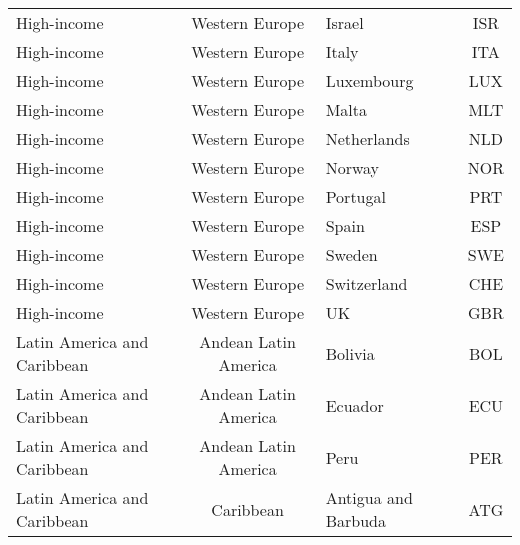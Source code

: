 \begin{landscape}
\begin{longtable}{|p{6cm}|c|p{5cm}|c|}
                                      High-income &               Western Europe &                                            Israel &  ISR \\
                                      High-income &               Western Europe &                                             Italy &  ITA \\
                                      High-income &               Western Europe &                                        Luxembourg &  LUX \\
                                      High-income &               Western Europe &                                             Malta &  MLT \\
                                      High-income &               Western Europe &                                       Netherlands &  NLD \\
                                      High-income &               Western Europe &                                            Norway &  NOR \\
                                      High-income &               Western Europe &                                          Portugal &  PRT \\
                                      High-income &               Western Europe &                                             Spain &  ESP \\
                                      High-income &               Western Europe &                                            Sweden &  SWE \\
                                      High-income &               Western Europe &                                       Switzerland &  CHE \\
                                      High-income &               Western Europe &                                                UK &  GBR \\
                      Latin America and Caribbean &         Andean Latin America &                                           Bolivia &  BOL \\
                      Latin America and Caribbean &         Andean Latin America &                                           Ecuador &  ECU \\
                      Latin America and Caribbean &         Andean Latin America &                                              Peru &  PER \\
                      Latin America and Caribbean &                    Caribbean &                               Antigua and Barbuda &  ATG \\

\end{longtable}
\end{landscape}
